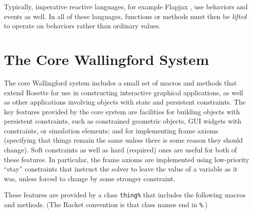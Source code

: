 \documentclass[reprint]{sigplanconf}
\begin{document}
Typically, imperative reactive languages, for example Flapjax
\cite{meyerovich-oopsla-2009}, use behaviors and events as well.  In
all of these languages, functions or methods must then be
\emph{lifted} to operate on behaviors rather than ordinary values.

\section{The Core Wallingford System}
\label{sec:core-wallingford}

The core Wallingford system includes a small set of macros and methods
that extend Rosette for use in constructing interactive graphical
applications, as well as other applications involving objects with
state and persistent constraints.  The key features provided by the
core system are facilities for building objects with persistent
constraints, such as constrained geometric objects, GUI widgets with
constraints, or simulation elements; and for implementing frame axioms
(specifying that things remain the same unless there is some reason
they should change).  Soft constraints as well as hard (required) ones
are useful for both of these features.  In particular, the frame
axioms are implemented using low-priority ``stay'' constraints that
instruct the solver to leave the value of a variable as it was, unless
forced to change by some stronger constraint.

These features are provided by a class \verb|thing%| that includes the
following macros and methods.  (The Racket convention is that class
names end in {\tt \%}.)
\end{document}
